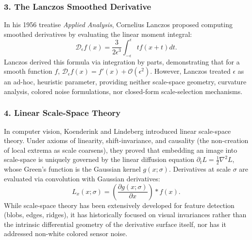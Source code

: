 \documentclass[11pt,a4paper]{article}
\theoremstyle{definition}
\begin{document}
\subsubsection{3. The Lanczos Smoothed Derivative}
In his 1956 treatise \emph{Applied Analysis}, Cornelius Lanczos \cite{lanczos1956} proposed computing smoothed derivatives by evaluating the linear moment integral:
\begin{equation}
\mathcal{D}_\epsilon f(x) = \frac{3}{2\epsilon^3} \int_{-\epsilon}^\epsilon t f(x + t) dt.
\label{eq:lanczos_original}
\end{equation}
Lanczos derived this formula via integration by parts, demonstrating that for a smooth function $f$, $\mathcal{D}_\epsilon f(x) = f'(x) + \mathcal{O}(\epsilon^2)$. However, Lanczos treated $\epsilon$ as an ad-hoc, heuristic parameter, providing neither scale-space geometry, curvature analysis, colored noise formulations, nor closed-form scale-selection mechanisms.

\subsubsection{4. Linear Scale-Space Theory}
In computer vision, Koenderink \cite{koenderink1984} and Lindeberg \cite{lindeberg1994} introduced linear scale-space theory. Under axioms of linearity, shift-invariance, and causality (the non-creation of local extrema as scale coarsens), they proved that embedding an image into scale-space is uniquely governed by the linear diffusion equation $\partial_t L = \frac{1}{2}\nabla^2 L$, whose Green's function is the Gaussian kernel $g(x; \sigma)$. Derivatives at scale $\sigma$ are evaluated via convolution with Gaussian derivatives:
\begin{equation}
L_{x}(x; \sigma) = \left( \frac{\partial g(x; \sigma)}{\partial x} \right) * f(x).
\end{equation}
While scale-space theory has been extensively developed for feature detection (blobs, edges, ridges), it has historically focused on visual invariances rather than the intrinsic differential geometry of the derivative surface itself, nor has it addressed non-white colored sensor noise.
\end{document}
